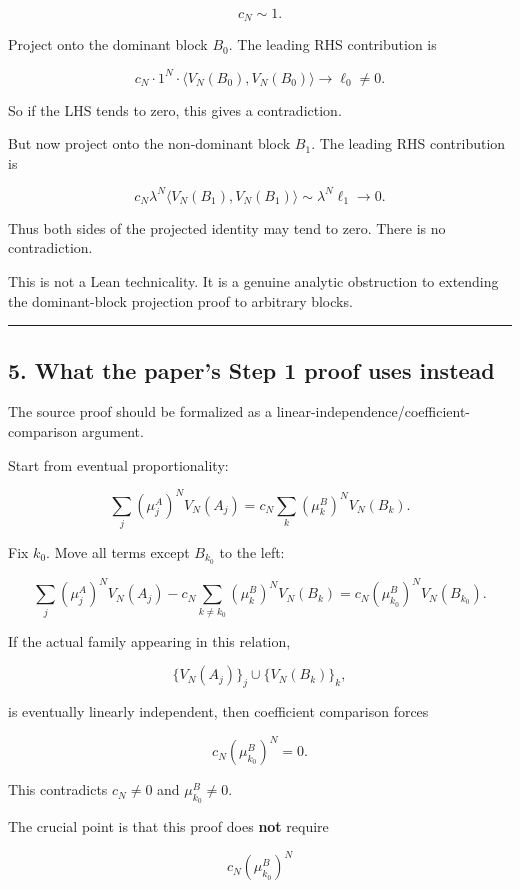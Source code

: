 \documentclass[
  11pt,
]{article}
\begin{document}
\[
c_N\sim 1.
\]

Project onto the dominant block \(B_0\). The leading RHS contribution is

\[
c_N\cdot 1^N\cdot
\langle V_N(B_0),V_N(B_0)\rangle
\to \ell_0\neq 0.
\]

So if the LHS tends to zero, this gives a contradiction.

But now project onto the non-dominant block \(B_1\). The leading RHS
contribution is

\[
c_N\lambda^N
\langle V_N(B_1),V_N(B_1)\rangle
\sim \lambda^N\ell_1
\to 0.
\]

Thus both sides of the projected identity may tend to zero. There is no
contradiction.

This is not a Lean technicality. It is a genuine analytic obstruction to
extending the dominant-block projection proof to arbitrary blocks.

\begin{center}\rule{0.5\linewidth}{0.5pt}\end{center}

\subsection{5. What the paper's Step 1 proof uses
instead}\label{what-the-papers-step-1-proof-uses-instead}

The source proof should be formalized as a
linear-independence/coefficient-comparison argument.

Start from eventual proportionality:

\[
\sum_j (\mu_j^A)^N V_N(A_j)
=
c_N\sum_k(\mu_k^B)^N V_N(B_k).
\]

Fix \(k_0\). Move all terms except \(B_{k_0}\) to the left:

\[
\sum_j (\mu_j^A)^N V_N(A_j)
-
c_N\sum_{k\neq k_0}(\mu_k^B)^N V_N(B_k)
=
c_N(\mu_{k_0}^B)^N V_N(B_{k_0}).
\]

If the actual family appearing in this relation,

\[
\{V_N(A_j)\}_j\cup \{V_N(B_k)\}_k,
\]

is eventually linearly independent, then coefficient comparison forces

\[
c_N(\mu_{k_0}^B)^N=0.
\]

This contradicts \(c_N\neq0\) and \(\mu_{k_0}^B\neq0\).

The crucial point is that this proof does \textbf{not} require

\[
c_N(\mu_{k_0}^B)^N
\]
\end{document}
